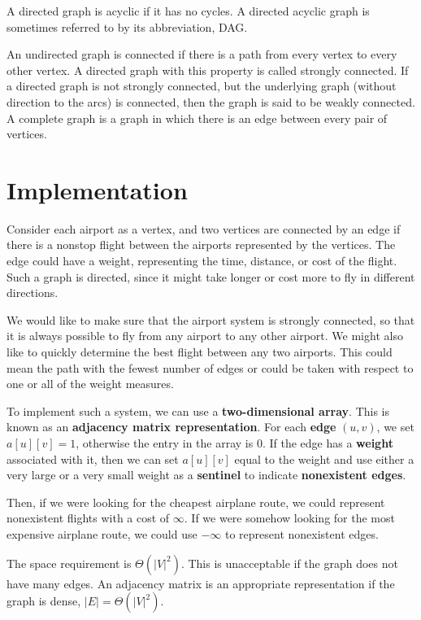 A directed graph is acyclic if it has no cycles. A directed acyclic graph is sometimes referred to by its abbreviation, DAG.

An undirected graph is connected if there is a path from every vertex to every other vertex. A directed graph with this property is called strongly connected. If a directed graph is not strongly connected, but the underlying graph (without direction to the arcs) is connected, then the graph is said to be weakly connected. A complete graph is a graph in which there is an edge between every pair of vertices.

\section{Implementation}
Consider each airport as a vertex, and two vertices are connected by an edge if there is a nonstop flight between the airports represented by the vertices. The edge could have a weight, representing the time, distance, or cost of the flight. Such a graph is directed, since it might take longer or cost more to fly in different directions.

We would like to make sure that the airport system is strongly connected, so that it is always possible to fly from any airport to any other airport. We might also like to quickly determine the best flight between any two airports. This could mean the path with the fewest number of edges or could be taken with respect to one or all of the weight measures.

To implement such a system, we can use a \textbf{two-dimensional array}. This is known as an \textbf{adjacency matrix representation}. For each \textbf{edge} \((u, v)\), we set \(a[u][v] = 1\), otherwise the entry in the array is 0. If the edge has a \textbf{weight} associated with it, then we can set \(a[u][v]\) equal to the weight and use either a very large or a very small weight as a \textbf{sentinel} to indicate \textbf{nonexistent edges}.

Then, if we were looking for the cheapest airplane route, we could represent nonexistent flights with a cost of \(\infty\). If we were somehow looking for the most expensive airplane route, we could use \(-\infty\) to represent nonexistent edges.

The space requirement is \(\Theta(\vert V \vert^2)\). This is unacceptable if the graph does not have many edges. An adjacency matrix is an appropriate representation if the graph is dense, \(\vert E \vert = \Theta(\vert V \vert^2)\).

